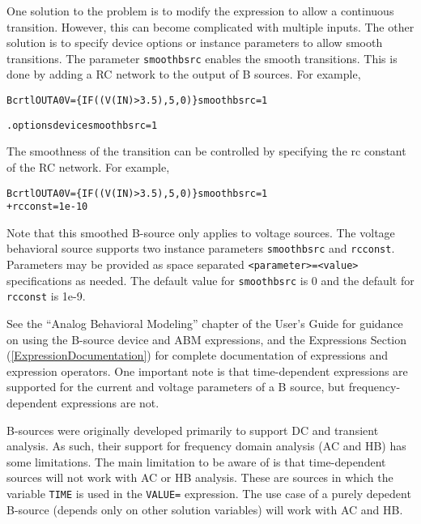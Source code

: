 \begin{Device}
One solution to the problem is to modify the expression to allow a continuous transition. 
However, this can become complicated with multiple inputs. The other solution is to specify
device options or instance parameters to allow smooth transitions. The parameter
\texttt{smoothbsrc} enables the smooth transitions. This is done by adding a RC network to the  
output of B sources. For example,

\begin{alltt} Bcrtl OUTA 0 V=\{ IF( (V(IN) > 3.5), 5, 0 ) \} smoothbsrc=1 \end{alltt}

\begin{alltt} .options device  smoothbsrc=1 \end{alltt}

The smoothness of the transition can be controlled by specifying the rc constant of 
the RC network. For example, 

\begin{alltt} Bcrtl OUTA 0 V=\{ IF( (V(IN) > 3.5), 5, 0 ) \} smoothbsrc=1   
 + rcconst = 1e-10 \end{alltt}

Note that this smoothed B-source only applies to voltage sources. The voltage behavioral source supports
two instance parameters \texttt{smoothbsrc} and \texttt{rcconst}. Parameters may be provided as space  
separated \texttt{<parameter>=<value>} specifications as needed. The default value for \texttt{smoothbsrc}
is 0 and the default for \texttt{rcconst} is 1e-9.

See the ``Analog Behavioral Modeling'' chapter of the \Xyce{} User's
Guide for guidance on using the B-source device and ABM expressions,
and the Expressions Section (\ref{ExpressionDocumentation}) for
complete documentation of expressions and expression operators.
One important note is that time-dependent expressions are supported
for the current and voltage parameters of a B source, but
frequency-dependent expressions are not.

B-sources were originally developed primarily to support DC and transient analysis.  
As such, their support for frequency domain analysis (AC and HB) has some limitations.  
The main limitation to be aware of is that time-dependent sources will not work with AC or HB analysis.  
These are sources in which the variable \texttt{TIME} is used in the \texttt{VALUE=} expression. 
The use case of a purely depedent B-source (depends only on other solution variables) will work with AC and HB.  

\end{Device}
